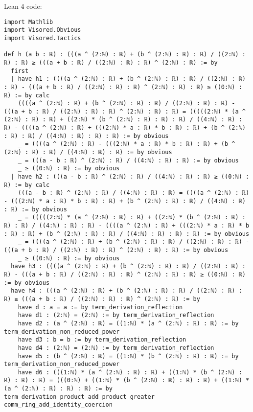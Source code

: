 \documentclass{article}
\begin{document}
Lean 4 code:
\begin{tcolorbox}[colback=white!10, width=\linewidth]
\begin{lstlisting}[language=Lean4]
import Mathlib
import Visored.Obvious
import Visored.Tactics

def h (a b : ℝ) : (((a ^ (2:ℕ) : ℝ) + (b ^ (2:ℕ) : ℝ) : ℝ) / ((2:ℕ) : ℝ) : ℝ) ≥ (((a + b : ℝ) / ((2:ℕ) : ℝ) : ℝ) ^ (2:ℕ) : ℝ) := by
  first
  | have h1 : ((((a ^ (2:ℕ) : ℝ) + (b ^ (2:ℕ) : ℝ) : ℝ) / ((2:ℕ) : ℝ) : ℝ) - (((a + b : ℝ) / ((2:ℕ) : ℝ) : ℝ) ^ (2:ℕ) : ℝ) : ℝ) ≥ ((0:ℕ) : ℝ) := by calc
    ((((a ^ (2:ℕ) : ℝ) + (b ^ (2:ℕ) : ℝ) : ℝ) / ((2:ℕ) : ℝ) : ℝ) - (((a + b : ℝ) / ((2:ℕ) : ℝ) : ℝ) ^ (2:ℕ) : ℝ) : ℝ) = (((((2:ℕ) * (a ^ (2:ℕ) : ℝ) : ℝ) + ((2:ℕ) * (b ^ (2:ℕ) : ℝ) : ℝ) : ℝ) / ((4:ℕ) : ℝ) : ℝ) - ((((a ^ (2:ℕ) : ℝ) + (((2:ℕ) * a : ℝ) * b : ℝ) : ℝ) + (b ^ (2:ℕ) : ℝ) : ℝ) / ((4:ℕ) : ℝ) : ℝ) : ℝ) := by obvious
    _ = ((((a ^ (2:ℕ) : ℝ) - (((2:ℕ) * a : ℝ) * b : ℝ) : ℝ) + (b ^ (2:ℕ) : ℝ) : ℝ) / ((4:ℕ) : ℝ) : ℝ) := by obvious
    _ = (((a - b : ℝ) ^ (2:ℕ) : ℝ) / ((4:ℕ) : ℝ) : ℝ) := by obvious
    _ ≥ ((0:ℕ) : ℝ) := by obvious
  | have h2 : (((a - b : ℝ) ^ (2:ℕ) : ℝ) / ((4:ℕ) : ℝ) : ℝ) ≥ ((0:ℕ) : ℝ) := by calc
    (((a - b : ℝ) ^ (2:ℕ) : ℝ) / ((4:ℕ) : ℝ) : ℝ) = ((((a ^ (2:ℕ) : ℝ) - (((2:ℕ) * a : ℝ) * b : ℝ) : ℝ) + (b ^ (2:ℕ) : ℝ) : ℝ) / ((4:ℕ) : ℝ) : ℝ) := by obvious
    _ = (((((2:ℕ) * (a ^ (2:ℕ) : ℝ) : ℝ) + ((2:ℕ) * (b ^ (2:ℕ) : ℝ) : ℝ) : ℝ) / ((4:ℕ) : ℝ) : ℝ) - ((((a ^ (2:ℕ) : ℝ) + (((2:ℕ) * a : ℝ) * b : ℝ) : ℝ) + (b ^ (2:ℕ) : ℝ) : ℝ) / ((4:ℕ) : ℝ) : ℝ) : ℝ) := by obvious
    _ = ((((a ^ (2:ℕ) : ℝ) + (b ^ (2:ℕ) : ℝ) : ℝ) / ((2:ℕ) : ℝ) : ℝ) - (((a + b : ℝ) / ((2:ℕ) : ℝ) : ℝ) ^ (2:ℕ) : ℝ) : ℝ) := by obvious
    _ ≥ ((0:ℕ) : ℝ) := by obvious
  have h3 : ((((a ^ (2:ℕ) : ℝ) + (b ^ (2:ℕ) : ℝ) : ℝ) / ((2:ℕ) : ℝ) : ℝ) - (((a + b : ℝ) / ((2:ℕ) : ℝ) : ℝ) ^ (2:ℕ) : ℝ) : ℝ) ≥ ((0:ℕ) : ℝ) := by obvious
  have h4 : (((a ^ (2:ℕ) : ℝ) + (b ^ (2:ℕ) : ℝ) : ℝ) / ((2:ℕ) : ℝ) : ℝ) ≥ (((a + b : ℝ) / ((2:ℕ) : ℝ) : ℝ) ^ (2:ℕ) : ℝ) := by
    have d : a = a := by term_derivation_reflection
    have d1 : (2:ℕ) = (2:ℕ) := by term_derivation_reflection
    have d2 : (a ^ (2:ℕ) : ℝ) = ((1:ℕ) * (a ^ (2:ℕ) : ℝ) : ℝ) := by term_derivation_non_reduced_power
    have d3 : b = b := by term_derivation_reflection
    have d4 : (2:ℕ) = (2:ℕ) := by term_derivation_reflection
    have d5 : (b ^ (2:ℕ) : ℝ) = ((1:ℕ) * (b ^ (2:ℕ) : ℝ) : ℝ) := by term_derivation_non_reduced_power
    have d6 : (((1:ℕ) * (a ^ (2:ℕ) : ℝ) : ℝ) + ((1:ℕ) * (b ^ (2:ℕ) : ℝ) : ℝ) : ℝ) = (((0:ℕ) + ((1:ℕ) * (b ^ (2:ℕ) : ℝ) : ℝ) : ℝ) + ((1:ℕ) * (a ^ (2:ℕ) : ℝ) : ℝ) : ℝ) := by term_derivation_product_add_product_greater comm_ring_add_identity_coercion

\end{lstlisting}
\end{tcolorbox}
\end{document}
